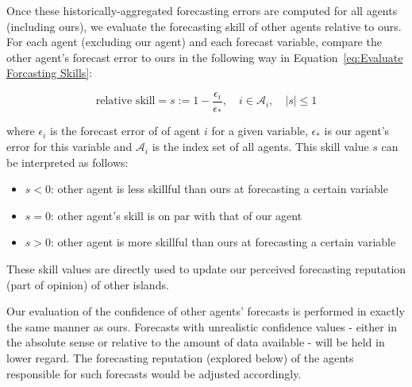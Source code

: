 Once these historically-aggregated forecasting errors are computed for all agents (including ours), we evaluate the forecasting skill of other agents relative to ours. For each agent (excluding our agent) and each forecast variable, compare the other agent's forecast error to ours in the following way in Equation~\ref{eq:Evaluate Forcasting Skills}:

\begin{equation}
\text{relative skill} = s := 1-\frac{\epsilon_i}{\epsilon_*},\quad i \in \mathcal{A}_i, \quad |s| \leq 1
\label{eq:Evaluate Forcasting Skills}
\end{equation}

where $\epsilon_i$ is the forecast error of of agent $i$ for a given variable, $\epsilon_*$ is our agent's error for this variable and $\mathcal{A}_i$ is the index set of all agents. This skill value $s$ can be interpreted as follows:

\begin{itemize}
    \item $s < 0$: other agent is less skillful than ours at forecasting a certain variable
    \item $s = 0$: other agent's skill is on par with that of our agent
    \item $s > 0$: other agent is more skillful than ours at forecasting a certain variable 
\end{itemize}

These skill values are directly used to update our perceived forecasting reputation (part of opinion) of other islands.

Our evaluation of the confidence of other agents' forecasts is performed in exactly the same manner as ours. Forecasts with unrealistic confidence values - either in the absolute sense or relative to the amount of data available - will be held in lower regard. The forecasting reputation (explored below) of the agents responsible for such forecasts would be adjusted accordingly. 

